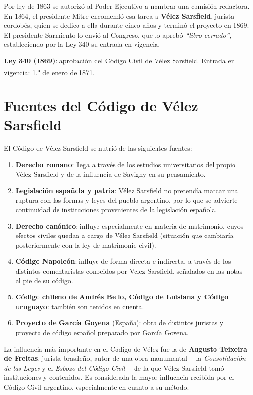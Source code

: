 \documentclass[12pt,oneside]{book}
\begin{document}
Por ley de 1863 se autorizó al Poder Ejecutivo a nombrar una comisión redactora. En 1864, el presidente Mitre encomendó esa tarea a \textbf{Vélez Sarsfield}, jurista cordobés, quien se dedicó a ella durante cinco años y terminó el proyecto en 1869. El presidente Sarmiento lo envió al Congreso, que lo aprobó \textit{``libro cerrado''}, estableciendo por la Ley 340 su entrada en vigencia.

\begin{important}
\textbf{Ley 340 (1869)}: aprobación del Código Civil de Vélez Sarsfield. Entrada en vigencia: 1.\textsuperscript{o} de enero de 1871.
\end{important}

\section{Fuentes del Código de Vélez Sarsfield}

El Código de Vélez Sarsfield se nutrió de las siguientes fuentes:

\begin{enumerate}
    \item[a)] \textbf{Derecho romano}: llega a través de los estudios universitarios del propio Vélez Sarsfield y de la influencia de Savigny en su pensamiento.
    \item[b)] \textbf{Legislación española y patria}: Vélez Sarsfield no pretendía marcar una ruptura con las formas y leyes del pueblo argentino, por lo que se advierte continuidad de instituciones provenientes de la legislación española.
    \item[c)] \textbf{Derecho canónico}: influye especialmente en materia de matrimonio, cuyos efectos civiles quedan a cargo de Vélez Sarsfield (situación que cambiaría posteriormente con la ley de matrimonio civil).
    \item[d)] \textbf{Código Napoleón}: influye de forma directa e indirecta, a través de los distintos comentaristas conocidos por Vélez Sarsfield, señalados en las notas al pie de su código.
    \item[e)] \textbf{Código chileno de Andrés Bello, Código de Luisiana y Código uruguayo}: también son tenidos en cuenta.
    \item[f)] \textbf{Proyecto de García Goyena} (España): obra de distintos juristas y proyecto de código español preparado por García Goyena.
\end{enumerate}

\begin{important}
La influencia más importante en el Código de Vélez fue la de \textbf{Augusto Teixeira de Freitas}, jurista brasileño, autor de una obra monumental —la \textit{Consolidación de las Leyes} y el \textit{Esbozo del Código Civil}— de la que Vélez Sarsfield tomó instituciones y contenidos. Es considerada la mayor influencia recibida por el Código Civil argentino, especialmente en cuanto a su método.
\end{important}
\end{document}
